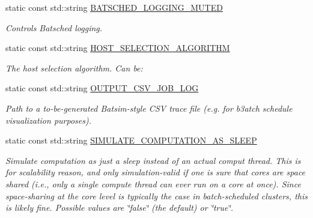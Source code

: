 \begin{DoxyCompactItemize}
static const std\+::string \hyperlink{classwrench_1_1_batch_service_property_aaab42384419440aacdbaac79e3346bf1}{B\+A\+T\+S\+C\+H\+E\+D\+\_\+\+L\+O\+G\+G\+I\+N\+G\+\_\+\+M\+U\+T\+ED}
\begin{DoxyCompactList}\small\item\em Controls Batsched logging. \end{DoxyCompactList}\item 
static const std\+::string \hyperlink{classwrench_1_1_batch_service_property_af75bbbe70a733d3a65cddc5c57b0b441}{H\+O\+S\+T\+\_\+\+S\+E\+L\+E\+C\+T\+I\+O\+N\+\_\+\+A\+L\+G\+O\+R\+I\+T\+HM}
\begin{DoxyCompactList}\small\item\em The host selection algorithm. Can be\+: \end{DoxyCompactList}\item 
static const std\+::string \hyperlink{classwrench_1_1_batch_service_property_a0757979b1512be80fda90cbab946b51f}{O\+U\+T\+P\+U\+T\+\_\+\+C\+S\+V\+\_\+\+J\+O\+B\+\_\+\+L\+OG}
\begin{DoxyCompactList}\small\item\em Path to a to-\/be-\/generated Batsim-\/style C\+SV trace file (e.\+g. for b3atch schedule visualization purposes). \end{DoxyCompactList}\item 
\mbox{\label{classwrench_1_1_batch_service_property_a0bde5c75f5f093ae15e68d67ae453ac3}} 
static const std\+::string \hyperlink{classwrench_1_1_batch_service_property_a0bde5c75f5f093ae15e68d67ae453ac3}{S\+I\+M\+U\+L\+A\+T\+E\+\_\+\+C\+O\+M\+P\+U\+T\+A\+T\+I\+O\+N\+\_\+\+A\+S\+\_\+\+S\+L\+E\+EP}
\begin{DoxyCompactList}\small\item\em Simulate computation as just a sleep instead of an actual comput thread. This is for scalability reason, and only simulation-\/valid if one is sure that cores are space shared (i.\+e., only a single compute thread can ever run on a core at once). Since space-\/sharing at the core level is typically the case in batch-\/scheduled clusters, this is likely fine. Possible values are \char`\"{}false\char`\"{} (the default) or \char`\"{}true\char`\"{}. \end{DoxyCompactList}\item 
\mbox{\label{classwrench_1_1_batch_service_property_a6a7fb4d9f505cc29f7236ea3e5713f34}} 

\end{DoxyCompactItemize}
